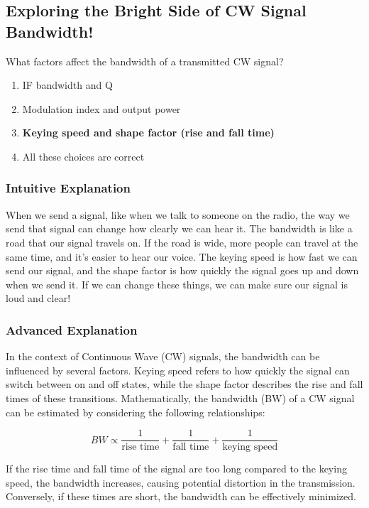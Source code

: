 \subsection{Exploring the Bright Side of CW Signal Bandwidth!}

\begin{tcolorbox}[colback=blue!5!white, colframe=blue!75!black, title=E8C12]
What factors affect the bandwidth of a transmitted CW signal?
\begin{enumerate}[label=\Alph*.]
    \item IF bandwidth and Q
    \item Modulation index and output power
    \item \textbf{Keying speed and shape factor (rise and fall time)}
    \item All these choices are correct
\end{enumerate}
\end{tcolorbox}

\subsubsection{Intuitive Explanation}

When we send a signal, like when we talk to someone on the radio, the way we send that signal can change how clearly we can hear it. The bandwidth is like a road that our signal travels on. If the road is wide, more people can travel at the same time, and it's easier to hear our voice. The keying speed is how fast we can send our signal, and the shape factor is how quickly the signal goes up and down when we send it. If we can change these things, we can make sure our signal is loud and clear!

\subsubsection{Advanced Explanation}

In the context of Continuous Wave (CW) signals, the bandwidth can be influenced by several factors. Keying speed refers to how quickly the signal can switch between on and off states, while the shape factor describes the rise and fall times of these transitions. Mathematically, the bandwidth (BW) of a CW signal can be estimated by considering the following relationships:

\[
BW \propto \frac{1}{\text{rise time}} + \frac{1}{\text{fall time}} + \frac{1}{\text{keying speed}}
\]

If the rise time and fall time of the signal are too long compared to the keying speed, the bandwidth increases, causing potential distortion in the transmission. Conversely, if these times are short, the bandwidth can be effectively minimized. 

